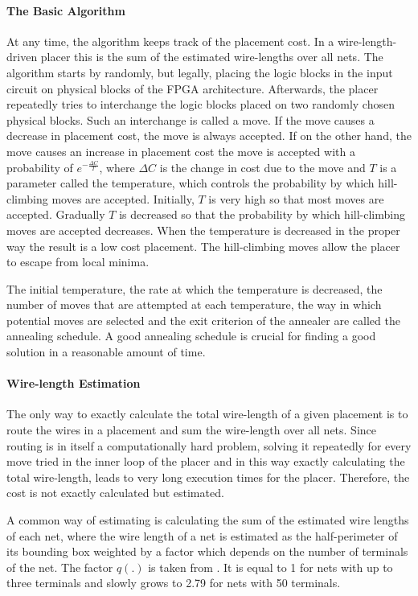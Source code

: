 \documentclass[a4paper,oneside,12pt]{article}
\begin{document}
\paragraph{The Basic Algorithm}
At any time, the algorithm keeps track of the placement cost. In a wire-length-driven placer this is the sum of the estimated wire-lengths over all nets. The algorithm starts by randomly, but legally, placing the logic blocks in the input circuit on physical blocks of the FPGA architecture. Afterwards, the placer repeatedly tries to interchange the logic blocks placed on two randomly chosen physical blocks. Such an interchange is called a move. If the move causes a decrease in placement cost, the move is always accepted. If on the other hand, the move causes an increase in placement cost the move is accepted with a probability of $e^{-\frac{\Delta C}{T}}$, where $\Delta C$ is the change in cost due to the move and $T$ is a parameter called the temperature, which controls the probability by which hill-climbing moves are accepted. Initially, $T$ is very high so that most moves are accepted. Gradually $T$ is decreased so that the probability by which hill-climbing moves are accepted decreases. When the temperature is decreased in the proper way the result is a low cost placement. The hill-climbing moves allow the placer to escape from local minima.


The initial temperature, the rate at which the temperature is decreased, the number of moves that are attempted at each temperature, the way in which potential moves are selected and the exit criterion of the annealer are called the annealing schedule. A good annealing schedule is crucial for finding a good solution in a reasonable amount of time.

\paragraph{Wire-length Estimation}
\label{sec:wireLengthEstimation} The only way to exactly calculate the total wire-length of a given placement is to route the wires in a placement and sum the wire-length over all nets. Since routing is in itself a computationally hard problem, solving it repeatedly for every move tried in the inner loop of the placer and in this way exactly calculating the total wire-length, leads to very long execution times for the placer. Therefore, the cost is not exactly calculated but estimated.

A common way of estimating is calculating the sum of the estimated wire lengths of each net, where the wire length of a net is estimated as the half-perimeter of its bounding box weighted by a factor which depends on the number of terminals of the net. The factor $q(.)$ is taken from \cite{cheng1994raaeprm}. It is equal to 1 for nets with up to three terminals and slowly grows to 2.79 for nets with 50 terminals.
\end{document}
